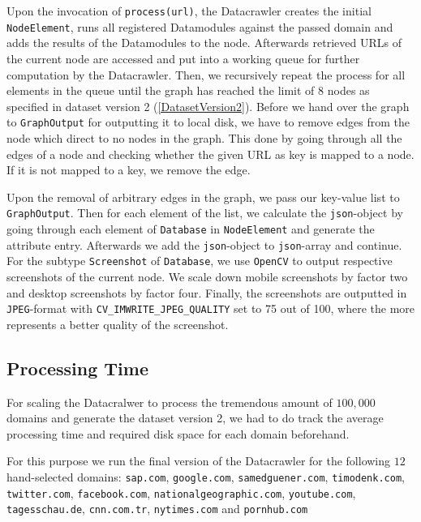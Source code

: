 Upon the invocation of \texttt{process(url)}, the Datacrawler creates the initial \texttt{NodeElement}, runs all registered Datamodules against the passed domain and adds the results of the Datamodules to the node. Afterwards retrieved URLs of the current node are accessed and put into a working queue for further computation by the Datacrawler. Then, we recursively repeat the process for all elements in the queue until the graph has reached the limit of 8 nodes as specified in dataset version 2 (\ref{DatasetVersion2}). Before we hand over the graph to \texttt{GraphOutput} for outputting it to local disk, we have to remove edges from the node which direct to no nodes in the graph. This done by going through all the edges of a node and checking whether the given URL as key is mapped to a node. If it is not mapped to a key, we remove the edge.

Upon the removal of arbitrary edges in the graph, we pass our key-value list to \texttt{GraphOutput}. Then for each element of the list, we calculate the \texttt{json}-object by going through each element of \texttt{Database} in \texttt{NodeElement} and generate the attribute entry. Afterwards we add the \texttt{json}-object to \texttt{json}-array and continue. For the subtype \texttt{Screenshot} of \texttt{Database}, we use \texttt{OpenCV} to output respective screenshots of the current node. We scale down mobile screenshots by factor two and desktop screenshots by factor four. Finally, the screenshots are outputted in \texttt{JPEG}-format with \texttt{CV\_IMWRITE\_JPEG\_QUALITY} set to 75 out of 100, where the more represents a better quality of the screenshot. 

\subsection{Processing Time}
\label{datacrawler_processing_time}
For scaling the Datacralwer to process the tremendous amount of $100,000$ domains and generate the dataset version 2, we had to do track the average processing time and required disk space for each domain beforehand.

For this purpose we run the final version of the Datacrawler for the following $12$ hand-selected domains: \texttt{sap.com}, \texttt{google.com}, \texttt{samedguener.com}, \texttt{timodenk.com}, \texttt{twitter.com}, \texttt{facebook.com}, \texttt{nationalgeographic.com}, \texttt{youtube.com}, \texttt{tagesschau.de}, \texttt{cnn.com.tr}, \texttt{nytimes.com} and \texttt{pornhub.com}

